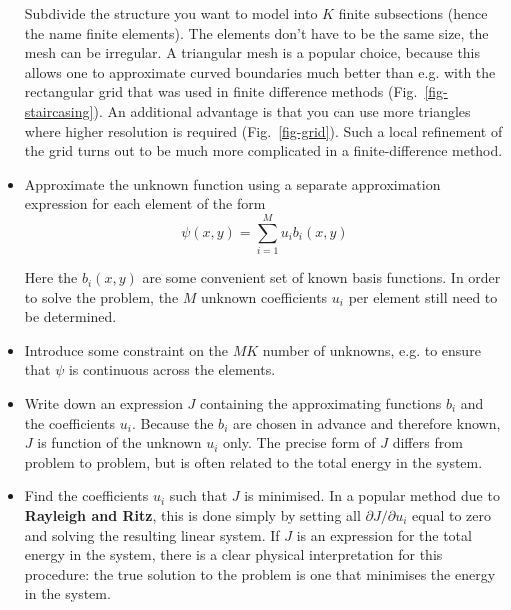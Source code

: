 \begin{itemize}
Subdivide the structure you want to model into $K$ finite subsections (hence the name finite elements). The elements don't have to be the same size, the mesh can be irregular. A triangular mesh is a popular choice, because this allows one to approximate curved boundaries much better than e.g. with the rectangular grid that was used in finite difference methods (Fig.~\ref{fig-staircasing}). An additional advantage is that you can use more triangles where higher resolution is required (Fig.~\ref{fig-grid}). Such a local refinement of the grid turns out to be much more complicated in a finite-difference method.
  

\item
Approximate the unknown function using a separate approximation expression for each element of the form
\begin{equation}
\psi(x,y) = \sum_{i=1}^M u_i b_i(x,y) \label{eq-fe-1}
\end{equation}

Here the $b_i(x,y)$ are some convenient set of known basis functions. In order to solve the problem, the $M$ unknown coefficients $u_i$ per element still need to be determined.
\item
  Introduce some constraint on the $MK$ number of unknowns, e.g. to ensure that $\psi$ is continuous across the elements.



\item
Write down an expression $J$ containing the approximating functions $b_i$ and the coefficients $u_i$. Because the $b_i$ are chosen in advance and therefore known, $J$ is function of the unknown $u_i$ only. The precise form of $J$ differs from problem to problem, but is often related to the total energy in the system.
\item
Find the coefficients $u_i$ such that $J$ is minimised. In a popular method due to \textbf{Rayleigh and Ritz}, this is done simply by setting all $\partial J / \partial u_i$ equal to zero and solving the resulting linear system. If $J$ is an expression for the total energy in the system, there is a clear physical interpretation for this procedure: the true solution to the problem is one that minimises the energy in the system.
\end{itemize}


\pagebreak




